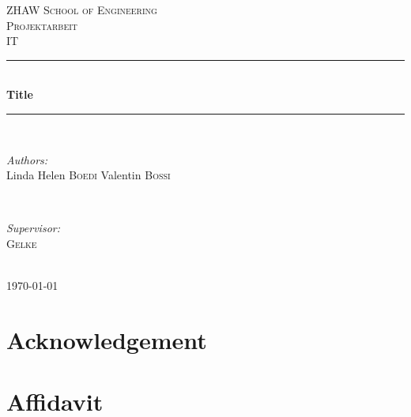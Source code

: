 \documentclass[12pt, a4paper]{report}
\begin{document}
\begin{titlepage}

\newcommand{\HRule}{\rule{\linewidth}{0.5mm}} %

\center %

\textsc{\LARGE ZHAW School of Engineering}\\[1.5cm] %
\textsc{\Large Projektarbeit}\\[0.5cm] %
\textsc{\large IT}\\[0.5cm] %

\HRule \\[0.4cm]
{ \huge \bfseries Title}\\[0.4cm] %
\HRule \\[1.5cm]


\begin{minipage}{0.4\textwidth}
\begin{flushleft} \large
\emph{Authors:}\\
Linda Helen \textsc{Boedi}  Valentin \textsc{Bossi} %
\end{flushleft}
\end{minipage}
~
\begin{minipage}{0.4\textwidth}
\begin{flushright} \large
\emph{Supervisor:} \\
 \textsc{Gelke} %
\end{flushright}
\end{minipage}\\[2cm]


{\large \today}\\[2cm] 


\vfill 

\end{titlepage}

\chapter{Acknowledgement}

\chapter{Affidavit}
\end{document}
